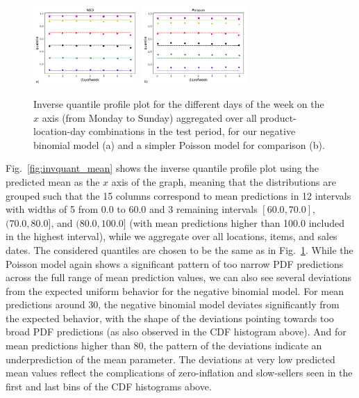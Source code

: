 \documentclass[BCOR=1mm, DIV=calc,10pt,
twoside=true,
twocolumn,
headings=normal]{scrartcl}
\newcommand{\fig}{Fig.~}
\begin{document}
\begin{figure}
\begin{center}
\includegraphics[width=4cm]{invquant_dayofweek_nbinom}
\includegraphics[width=4cm]{invquant_dayofweek_poisson}
\caption{\label{fig:invquant_dayofweek} Inverse quantile profile plot for the different days of the week on the $x$ axis (from Monday to Sunday) aggregated over all product-location-day combinations in the test period, for our negative binomial model (a) and a simpler Poisson model for comparison (b).}
\end{center}
\end{figure}

\fig \ref{fig:invquant_mean} shows the inverse quantile profile plot using the predicted mean as the $x$ axis of the graph, meaning that the distributions are grouped such that the 15 columns correspond to mean predictions in 12 intervals with widths of 5 from 0.0 to 60.0 and 3 remaining intervals $[60.0, 70.0]$, $(70.0, 80.0]$, and $(80.0, 100.0]$ (with mean predictions higher than 100.0 included in the highest interval), while we aggregate over all locations, items, and sales dates. The considered quantiles are chosen to be the same as in \fig \ref{fig:invquant_dayofweek}. While the Poisson model again shows a significant pattern of too narrow PDF predictions across the full range of mean prediction values, we can also see several deviations from the expected uniform behavior for the negative binomial model. For mean predictions around $30$, the negative binomial model deviates significantly from the expected behavior, with the shape of the deviations pointing towards too broad PDF predictions (as also observed in the CDF histogram above). And for mean predictions higher than $80$, the pattern of the deviations indicate an underprediction of the mean parameter. The deviations at very low predicted mean values reflect the complications of zero-inflation and slow-sellers seen in the first and last bins of the CDF histograms above.
\end{document}
